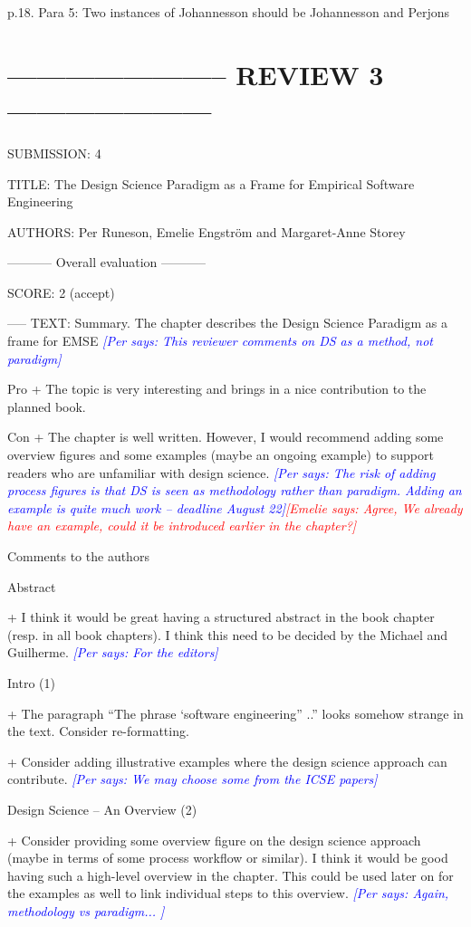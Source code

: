 \documentclass{article}
\newcommand{\emelie}[1]{\textcolor{red}{{\it [Emelie says: #1]}}}
\newcommand{\per}[1]{\textcolor{blue}
        	{{\it [Per says: #1]}}}
\newcommand{\emelie}[1]{}
\newcommand{\per}[1]{}
\begin{document}
p.18. Para 5: Two instances of Johannesson should be Johannesson and Perjons



\section*{----------------------- REVIEW 3 ---------------------}
SUBMISSION: 4

TITLE: The Design Science Paradigm as a Frame for Empirical Software Engineering

AUTHORS: Per Runeson, Emelie Engström and Margaret-Anne Storey

----------- Overall evaluation -----------

SCORE: 2 (accept)

----- TEXT:
Summary. The chapter describes the Design Science Paradigm as a frame for EMSE 
\per{This reviewer comments on DS as a method, not paradigm}

Pro
+ The topic is very interesting and brings in a nice contribution to the planned book.

Con
+ The chapter is well written. However, I would recommend adding some overview figures and some examples (maybe an ongoing example) to support readers who are unfamiliar with design science. \per{The risk of adding process figures is that DS is seen as methodology rather than paradigm. Adding an example is quite much work -- deadline August 22}\emelie{Agree, We already have an example, could it be introduced earlier in the chapter?}

Comments to the authors

Abstract

+ I think it would be great having a structured abstract in the book chapter (resp. in all book chapters). I think this need to be decided by the Michael and Guilherme. \per{For the editors}

Intro (1)

+ The paragraph “The phrase ‘software engineering” ..” looks somehow strange in the text. Consider re-formatting.

+ Consider adding illustrative examples where the design science approach can contribute. \per{We may choose some from the ICSE papers}

Design Science – An Overview (2)

+ Consider providing some overview figure on the design science approach (maybe in terms of some process workflow or similar). I think it would be good having such a high-level overview in the chapter. This could be used later on for the examples as well to link individual steps to this overview. \per{Again, methodology vs paradigm... }
\end{document}
